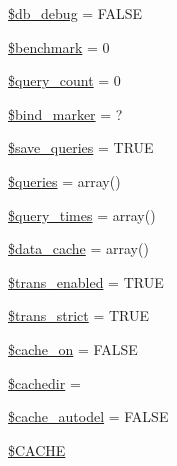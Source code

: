 \begin{DoxyCompactItemize}
\item 
\hyperlink{class_c_i___d_b__driver_a2c1bc80cc98589e419a6c535e53735de}{\$db\+\_\+debug} = F\+A\+L\+S\+E
\item 
\hyperlink{class_c_i___d_b__driver_ac75dbf878e2ceec25d2abe6730855f6b}{\$benchmark} = 0
\item 
\hyperlink{class_c_i___d_b__driver_aa7f7fc5b08bc2c3626ea7065d50c8847}{\$query\+\_\+count} = 0
\item 
\hyperlink{class_c_i___d_b__driver_a253af4ebf23051f23690926079f4285d}{\$bind\+\_\+marker} = \textquotesingle{}?\textquotesingle{}
\item 
\hyperlink{class_c_i___d_b__driver_a083a278ea2075824db1db85edaa8e0a8}{\$save\+\_\+queries} = T\+R\+U\+E
\item 
\hyperlink{class_c_i___d_b__driver_a576b05de2f452e4cce4e3de12667ba0f}{\$queries} = array()
\item 
\hyperlink{class_c_i___d_b__driver_a060b2893433dfc037803cf6541420f5f}{\$query\+\_\+times} = array()
\item 
\hyperlink{class_c_i___d_b__driver_aab3007e30adbaf71d06218aa6c90e384}{\$data\+\_\+cache} = array()
\item 
\hyperlink{class_c_i___d_b__driver_a450683d6d87929985766484b2f6a9e7b}{\$trans\+\_\+enabled} = T\+R\+U\+E
\item 
\hyperlink{class_c_i___d_b__driver_ae3111155f1f3ec59fe667b90dafb179f}{\$trans\+\_\+strict} = T\+R\+U\+E
\item 
\hyperlink{class_c_i___d_b__driver_ab29a8930111a4f2a57987a9031982c34}{\$cache\+\_\+on} = F\+A\+L\+S\+E
\item 
\hyperlink{class_c_i___d_b__driver_a01f61437be9e9a04ee228f5d455265db}{\$cachedir} = \textquotesingle{}\textquotesingle{}
\item 
\hyperlink{class_c_i___d_b__driver_a3da421c22206e24614dc73c9536ff605}{\$cache\+\_\+autodel} = F\+A\+L\+S\+E
\item 
\hyperlink{class_c_i___d_b__driver_a54f3ab89da1323e5680116d8e9e94b83}{\$\+C\+A\+C\+H\+E}
\end{DoxyCompactItemize}
